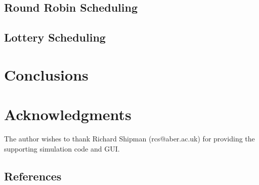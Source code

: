 \documentclass{acm_proc_article-sp}
\begin{document}
\subsection{Round Robin Scheduling}

\subsection{Lottery Scheduling}

\section{Conclusions}

\section{Acknowledgments}
The author wishes to thank Richard Shipman (rcs@aber.ac.uk) for providing the supporting simulation code and GUI.


\appendix
\subsection{References}
\balancecolumns
\end{document}
